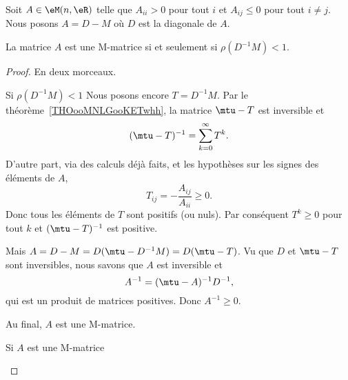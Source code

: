 \begin{proposition}     \label{PROPooWVHXooCfsvGq}
	Soit \( A\in \eM(n,\eR)\) telle que \( A_{ii}>0\) pour tout \( i\) et \( A_{ij}\leq 0\) pour tout \( i\neq j\). Nous posons \( A=D-M\) où \( D\) est la diagonale de \( A\).

	La matrice \( A\) est une M-matrice si et seulement si \( \rho(D^{-1}M)<1\).
\end{proposition}

\begin{proof}
	En deux morceaux.
	\begin{subproof}
		\item[Si \( \rho(D^{-1}M)<1\)]
		Nous posons encore \( T=D^{-1}M\). Par le théorème~\ref{THOooMNLGooKETwhh}, la matrice \( \mtu-T\) est inversible et
		\begin{equation}
			(\mtu-T)^{-1}=\sum_{k=0}^{\infty}T^k.
		\end{equation}
		D'autre part, via des calculs déjà faits, et les hypothèses sur les signes des éléments de \( A\),
		\begin{equation}
			T_{ij}=-\frac{ A_{ij} }{ A_{ii} }\geq 0.
		\end{equation}
		Donc tous les éléments de \( T\) sont positifs (ou nuls). Par conséquent \( T^k\geq 0\) pour tout \( k\) et \( (\mtu-T)^{-1}\) est positive.

		Mais \( A=D-M=D(\mtu-D^{-1}M)=D(\mtu-T)\). Vu que \( D\) et \( \mtu-T\) sont inversibles, nous savons que \( A\) est inversible et
		\begin{equation}
			A^{-1}=(\mtu-A)^{-1}D^{-1},
		\end{equation}
		qui est un produit de matrices positives. Donc \( A^{-1}\geq 0\).

		Au final, \( A\) est une M-matrice.

		\item[Si \( A\) est une M-matrice]



\end{subproof}
\end{proof}
